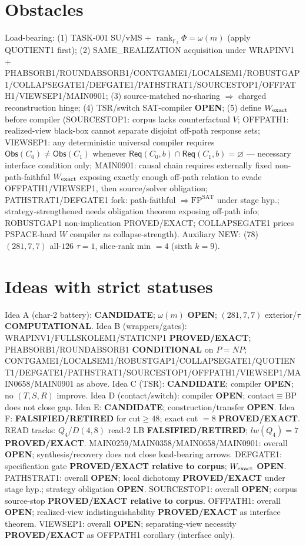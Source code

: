 \documentclass[11pt]{article}
\begin{document}
\section*{Obstacles}
Load-bearing: (1) TASK-001 SU/vMS + $\operatorname{rank}_{\mathbb F_2}\Phi=\omega(m)$ (apply QUOTIENT1 first);
(2) SAME\_REALIZATION acquisition under WRAPINV1 + PHABSORB1/ROUNDABSORB1/CONTGAME1/LOCALSEM1/ROBUSTGAP1/COLLAPSEGATE1/DEFGATE1/PATHSTRAT1/SOURCESTOP1/OFFPATH1/VIEWSEP1/MAIN0901;
(3) source-matched no-sharing $\Rightarrow$ charged reconstruction hinge;
(4) TSR/switch SAT-compiler \textbf{OPEN};
(5) define $W_{\rm exact}$ before compiler (SOURCESTOP1: corpus lacks counterfactual $V$;
OFFPATH1: realized-view black-box cannot separate disjoint off-path response sets;
VIEWSEP1: any deterministic universal compiler requires $\mathsf{Obs}(C_0)\ne\mathsf{Obs}(C_1)$
whenever $\mathsf{Req}(C_0,b)\cap\mathsf{Req}(C_1,b)=\varnothing$ --- necessary interface condition only;
MAIN0901: causal chain requires externally fixed non-path-faithful $W_{\rm exact}$ exposing
exactly enough off-path relation to evade OFFPATH1/VIEWSEP1, then source/solver obligation;
PATHSTRAT1/DEFGATE1 fork: path-faithful $\Rightarrow\mathrm{FP}^{\mathrm{SAT}}$ under stage hyp.;
strategy-strengthened needs obligation theorem exposing off-path info;
ROBUSTGAP1 non-implication PROVED/EXACT; COLLAPSEGATE1 prices PSPACE-hard $W$ compiler as collapse-strength).
Auxiliary NEW: (78) $(281,7,7)$ all-$126$ $\tau{=}1$, slice-rank min $=4$ (sixth $k{=}9$).

\section*{Ideas with strict statuses}
Idea A (char-2 battery): \textbf{CANDIDATE}; $\omega(m)$ \textbf{OPEN}; $(281,7,7)$ exterior/$\tau$ \textbf{COMPUTATIONAL}.
Idea B (wrappers/gates): WRAPINV1/FULLSKOLEM1/STATICNP1 \textbf{PROVED/EXACT};
PHABSORB1/ROUNDABSORB1 \textbf{CONDITIONAL} on $P=NP$;
CONTGAME1/LOCALSEM1/ROBUSTGAP1/COLLAPSEGATE1/QUOTIENT1/DEFGATE1/PATHSTRAT1/SOURCESTOP1/OFFPATH1/VIEWSEP1/MAIN0658/MAIN0901 as above.
Idea C (TSR): \textbf{CANDIDATE}; compiler \textbf{OPEN}; no $(T,S,R)$ improve.
Idea D (contact/switch): compiler \textbf{OPEN}; contact$\equiv$BP does not close gap.
Idea E: \textbf{CANDIDATE}; construction/transfer \textbf{OPEN}.
Idea F: \textbf{FALSIFIED/RETIRED} for cut$\ge48$; exact cut $=8$ \textbf{PROVED/EXACT}.
READ tracks: $Q_4$/$D(4,8)$ read-$2$ LB \textbf{FALSIFIED/RETIRED}; $lw(Q_4)=7$ \textbf{PROVED/EXACT}.
MAIN0259/MAIN0358/MAIN0658/MAIN0901: overall \textbf{OPEN}; synthesis/recovery does not close load-bearing arrows.
DEFGATE1: specification gate \textbf{PROVED/EXACT relative to corpus}; $W_{\rm exact}$ \textbf{OPEN}.
PATHSTRAT1: overall \textbf{OPEN}; local dichotomy \textbf{PROVED/EXACT} under stage hyp.; strategy obligation \textbf{OPEN}.
SOURCESTOP1: overall \textbf{OPEN}; corpus source-stop \textbf{PROVED/EXACT relative to corpus}.
OFFPATH1: overall \textbf{OPEN}; realized-view indistinguishability \textbf{PROVED/EXACT} as interface theorem.
VIEWSEP1: overall \textbf{OPEN}; separating-view necessity \textbf{PROVED/EXACT} as OFFPATH1 corollary (interface only).
\end{document}
